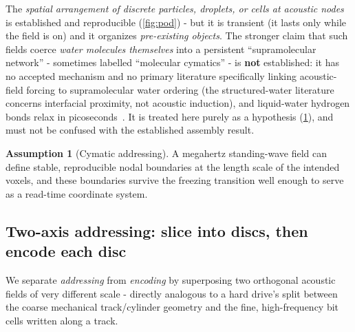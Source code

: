 \documentclass[11pt]{article}
\theoremstyle{definition}
\newtheorem{assumption}{Assumption}
\begin{document}
\begin{epistemic}[colback=warnbg]
The \emph{spatial arrangement of discrete particles, droplets, or cells at acoustic nodes}
is established and reproducible (\cref{fig:pod}) - but it is transient (it lasts only while
the field is on) and it organizes \emph{pre-existing objects}. The stronger claim that such
fields coerce \emph{water molecules themselves} into a persistent ``supramolecular
network'' - sometimes labelled ``molecular cymatics'' - is \textbf{not} established: it has
no accepted mechanism and no primary literature specifically linking acoustic-field forcing
to supramolecular water ordering (the structured-water
literature~\cite{pollack2013fourth,elton2020ez} concerns interfacial proximity, not
acoustic induction), and liquid-water hydrogen bonds relax in
picoseconds~\cite{cowan2005water}. It is treated here purely as a hypothesis
(\cref{as:cymgrid}), and must not be confused with the established assembly result.
\end{epistemic}

\begin{assumption}[Cymatic addressing]\label{as:cymgrid}
A megahertz standing-wave field can define stable, reproducible nodal boundaries at the
length scale of the intended voxels, and these boundaries survive the freezing transition
well enough to serve as a read-time coordinate system.
\end{assumption}

\subsection{Two-axis addressing: slice into discs, then encode each disc}
\label{sec:biaxial}
We separate \emph{addressing} from \emph{encoding} by superposing two orthogonal acoustic
fields of very different scale - directly analogous to a hard drive's split between the
coarse mechanical track/cylinder geometry and the fine, high-frequency bit cells written
along a track.
\end{document}
